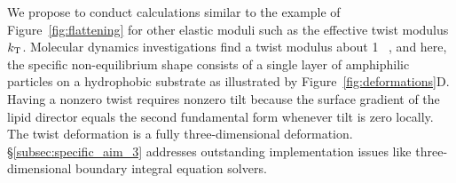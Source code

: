 
%
%

We propose to conduct calculations similar to the example of Figure~\ref{fig:flattening}
for other elastic moduli such as the effective twist modulus $k_{\mathrm{T}}$.
Molecular dynamics investigations find a twist modulus about 1
\kBT~\cite{LeVeWa14}, and here, the specific non-equilibrium shape consists of
a single layer of amphiphilic particles on a hydrophobic substrate as
illustrated by Figure~\ref{fig:deformations}D. Having a nonzero twist
requires nonzero tilt because the surface gradient of the lipid
director equals the second fundamental form
whenever tilt is zero locally. The twist deformation is a fully
three-dimensional deformation. \S\ref{subsec:specific_aim_3} addresses outstanding implementation issues like three-dimensional boundary integral equation solvers.

